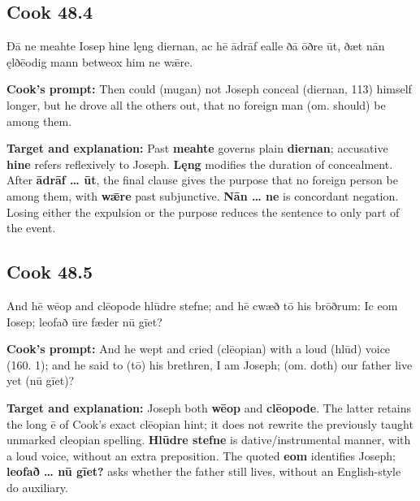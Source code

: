 \par\begin{minipage}{\linewidth}\raggedright
\subsection*{Cook 48.4}

Ðā ne meahte Iosep hine lęng diernan, ac hē ādrāf ealle ðā ōðre ūt, ðæt nān ęlðēodig mann betweox him ne wǣre.

\textbf{Cook’s prompt:} Then could (mugan) not Joseph conceal (diernan, 113) himself longer, but he drove all the others out, that no foreign man (om. should) be among them.

\textbf{Target and explanation:} Past \textbf{meahte} governs plain \textbf{diernan}; accusative \textbf{hine} refers reflexively to Joseph. \textbf{Lęng} modifies the duration of concealment. After \textbf{ādrāf … ūt}, the final clause gives the purpose that no foreign person be among them, with \textbf{wǣre} past subjunctive. \textbf{Nān … ne} is concordant negation. Losing either the expulsion or the purpose reduces the sentence to only part of the event.

\end{minipage}\par\addvspace{4pt}

\par\begin{minipage}{\linewidth}\raggedright
\subsection*{Cook 48.5}

And hē wēop and clēopode hlūdre stefne; and hē cwæð tō his brōðrum: Ic eom Iosep; leofað ūre fæder nū gīet?

\textbf{Cook’s prompt:} And he wept and cried (clēopian) with a loud (hlūd) voice (160. 1); and he said to (tō) his brethren, I am Joseph; (om. doth) our father live yet (nū gīet)?

\textbf{Target and explanation:} Joseph both \textbf{wēop} and \textbf{clēopode}. The latter retains the long ē of Cook’s exact clēopian hint; it does not rewrite the previously taught unmarked cleopian spelling. \textbf{Hlūdre stefne} is dative/\allowbreak{}instrumental manner, with a loud voice, without an extra preposition. The quoted \textbf{eom} identifies Joseph; \textbf{leofað … nū gīet?} asks whether the father still lives, without an English-style do auxiliary.

\end{minipage}\par\addvspace{4pt}

